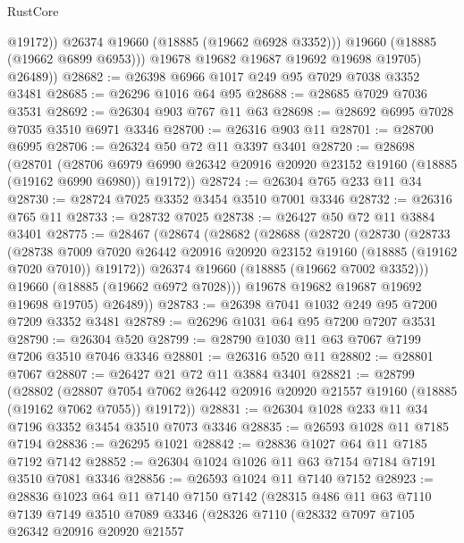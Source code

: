 \begin{lexlean}{RustCore}
\begin{coremodule}
                  @19172))
              @26374
              @19660
              (@18885 (@19662 @6928 @3352)))
            @19660
            (@18885 (@19662 @6899 @6953)))
          @19678
          @19682
          @19687
          @19692
          @19698
          @19705)
        @26489))
@28682 := @26398 @6966 @1017 @249 @95 @7029 @7038 @3352 @3481
@28685 := @26296 @1016 @64 @95
@28688 := @28685 @7029 @7036 @3531
@28692 := @26304 @903 @767 @11 @63
@28698 := @28692 @6995 @7028 @7035 @3510 @6971 @3346
@28700 := @26316 @903 @11
@28701 := @28700 @6995
@28706 := @26324 @50 @72 @11 @3397 @3401
@28720 := @28698
    (@28701
      (@28706 @6979 @6990 @26342 @20916 @20920 @23152 @19160 (@18885 (@19162 @6990 @6980)) @19172))
@28724 := @26304 @765 @233 @11 @34
@28730 := @28724 @7025 @3352 @3454 @3510 @7001 @3346
@28732 := @26316 @765 @11
@28733 := @28732 @7025
@28738 := @26427 @50 @72 @11 @3884 @3401
@28775 := @28467
    (@28674
      (@28682
        (@28688
          (@28720
            (@28730
              (@28733
                (@28738
                  @7009
                  @7020
                  @26442
                  @20916
                  @20920
                  @23152
                  @19160
                  (@18885 (@19162 @7020 @7010))
                  @19172))
              @26374
              @19660
              (@18885 (@19662 @7002 @3352)))
            @19660
            (@18885 (@19662 @6972 @7028)))
          @19678
          @19682
          @19687
          @19692
          @19698
          @19705)
        @26489))
@28783 := @26398 @7041 @1032 @249 @95 @7200 @7209 @3352 @3481
@28789 := @26296 @1031 @64 @95 @7200 @7207 @3531
@28790 := @26304 @520
@28799 := @28790 @1030 @11 @63 @7067 @7199 @7206 @3510 @7046 @3346
@28801 := @26316 @520 @11
@28802 := @28801 @7067
@28807 := @26427 @21 @72 @11 @3884 @3401
@28821 := @28799
    (@28802
      (@28807 @7054 @7062 @26442 @20916 @20920 @21557 @19160 (@18885 (@19162 @7062 @7055)) @19172))
@28831 := @26304 @1028 @233 @11 @34 @7196 @3352 @3454 @3510 @7073 @3346
@28835 := @26593 @1028 @11 @7185 @7194
@28836 := @26295 @1021
@28842 := @28836 @1027 @64 @11 @7185 @7192 @7142
@28852 := @26304 @1024 @1026 @11 @63 @7154 @7184 @7191 @3510 @7081 @3346
@28856 := @26593 @1024 @11 @7140 @7152
@28923 := @28836
    @1023
    @64
    @11
    @7140
    @7150
    @7142
    (@28315
      @486
      @11
      @63
      @7110
      @7139
      @7149
      @3510
      @7089
      @3346
      (@28326
        @7110
        (@28332
          @7097
          @7105
          @26342
          @20916
          @20920
          @21557

\end{coremodule}
\end{lexlean}
